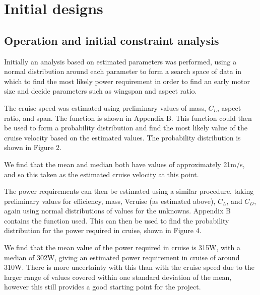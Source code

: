 \documentclass[../../main.tex]{subfiles}
\begin{document}

\section{Initial designs} \label{sec:design-process:initial-designs}

\subsection{Operation and initial constraint analysis} \label{sec:design-process:initial-designs:operation-and-initial-constraint-analysis}

Initially an analysis based on estimated parameters was performed, using a normal distribution around each parameter to form a search space of data in which to find the most likely power requirement in order to find an early motor size and decide parameters such as wingspan and aspect ratio. 

The cruise speed was estimated using preliminary values of mass, $C_L$, aspect ratio, and span. The function is shown in Appendix B.
This function could then be used to form a probability distribution and find the most likely value of the cruise velocity based on the estimated values.
The probability distribution is shown in Figure 2.


We find that the mean and median both have values of approximately 21m/s, and so this taken as the estimated cruise velocity at this point. 

The power requirements can then be estimated using a similar procedure, taking preliminary values for efficiency, mass, Vcruise (as estimated above), $C_L$, and $C_D$, again using normal distributions of values for the unknowns.
Appendix B contains the function used.
This can then be used to find the probability distribution for the power required in cruise, shown in Figure 4.


We find that the mean value of the power required in cruise is 315W, with a median of 302W, giving an estimated power requirement in cruise of around 310W.
There is more uncertainty with this than with the cruise speed due to the larger range of values covered within one standard deviation of the mean, however this still provides a good starting point for the project.
\end{document}
